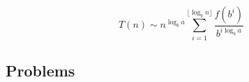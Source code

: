 \documentclass{article}
\begin{document}
\[T(n) \sim n^{\log_ba} \sum_{i=1}^{\lfloor \log_b n\rfloor}\frac{f(b^i)}{b^{i\log_b a}}\]



\subsection*{Problems}
\end{document}

